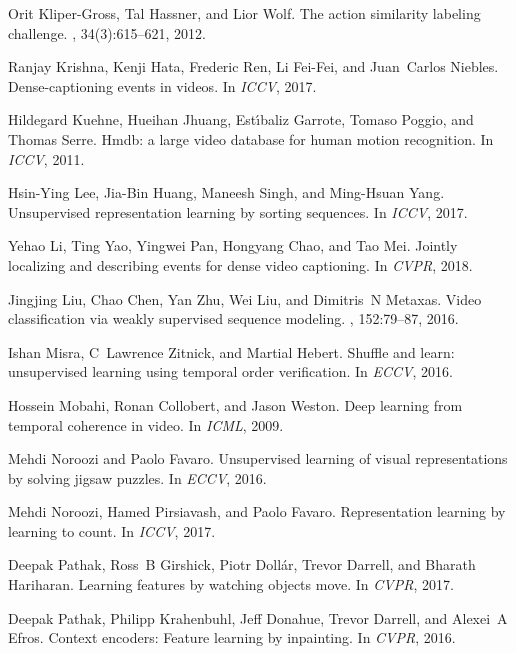 \documentclass[10pt,twocolumn,letterpaper]{article}
\begin{document}
{\begin{thebibliography}{10}
Orit Kliper-Gross, Tal Hassner, and Lior Wolf.
\newblock The action similarity labeling challenge.
, 34(3):615--621, 2012.

Ranjay Krishna, Kenji Hata, Frederic Ren, Li Fei-Fei, and Juan~Carlos Niebles.
\newblock Dense-captioning events in videos.
\newblock In {\em ICCV}, 2017.

Hildegard Kuehne, Hueihan Jhuang, Est{\'\i}baliz Garrote, Tomaso Poggio, and
  Thomas Serre.
\newblock Hmdb: a large video database for human motion recognition.
\newblock In {\em ICCV}, 2011.

Hsin-Ying Lee, Jia-Bin Huang, Maneesh Singh, and Ming-Hsuan Yang.
\newblock Unsupervised representation learning by sorting sequences.
\newblock In {\em ICCV}, 2017.

Yehao Li, Ting Yao, Yingwei Pan, Hongyang Chao, and Tao Mei.
\newblock Jointly localizing and describing events for dense video captioning.
\newblock In {\em CVPR}, 2018.

Jingjing Liu, Chao Chen, Yan Zhu, Wei Liu, and Dimitris~N Metaxas.
\newblock Video classification via weakly supervised sequence modeling.
, 152:79--87, 2016.

Ishan Misra, C~Lawrence Zitnick, and Martial Hebert.
\newblock Shuffle and learn: unsupervised learning using temporal order
  verification.
\newblock In {\em ECCV}, 2016.

Hossein Mobahi, Ronan Collobert, and Jason Weston.
\newblock Deep learning from temporal coherence in video.
\newblock In {\em ICML}, 2009.

Mehdi Noroozi and Paolo Favaro.
\newblock Unsupervised learning of visual representations by solving jigsaw
  puzzles.
\newblock In {\em ECCV}, 2016.

Mehdi Noroozi, Hamed Pirsiavash, and Paolo Favaro.
\newblock Representation learning by learning to count.
\newblock In {\em ICCV}, 2017.

Deepak Pathak, Ross~B Girshick, Piotr Doll{\'a}r, Trevor Darrell, and Bharath
  Hariharan.
\newblock Learning features by watching objects move.
\newblock In {\em CVPR}, 2017.

Deepak Pathak, Philipp Krahenbuhl, Jeff Donahue, Trevor Darrell, and Alexei~A
  Efros.
\newblock Context encoders: Feature learning by inpainting.
\newblock In {\em CVPR}, 2016.


\end{thebibliography}}
\end{document}
